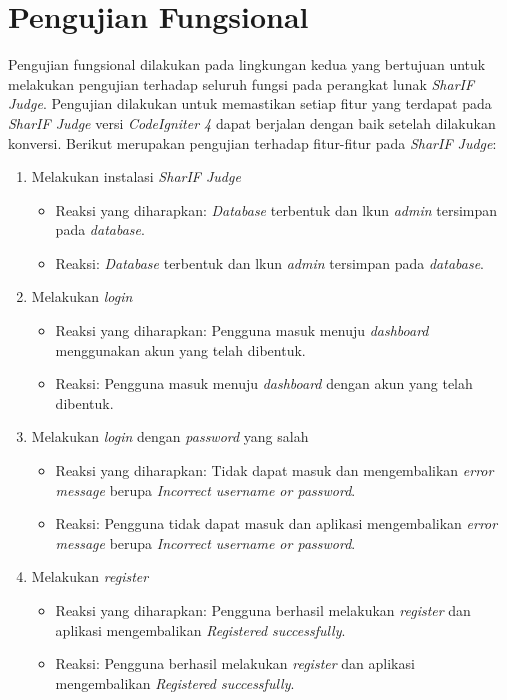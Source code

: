\section{Pengujian Fungsional}
Pengujian fungsional dilakukan pada lingkungan kedua yang bertujuan untuk melakukan pengujian terhadap seluruh fungsi pada perangkat lunak \textit{SharIF Judge}. Pengujian dilakukan untuk memastikan setiap fitur yang terdapat pada \textit{SharIF Judge} versi \textit{CodeIgniter 4} dapat berjalan dengan baik setelah dilakukan konversi. Berikut merupakan pengujian terhadap fitur-fitur pada \textit{SharIF Judge}:
\begin{enumerate}
	\item Melakukan instalasi \textit{SharIF Judge}
		\begin{itemize}
			\item Reaksi yang diharapkan: \textit{Database} terbentuk dan lkun \textit{admin} tersimpan pada \textit{database}.
			\item Reaksi: \textit{Database} terbentuk dan lkun \textit{admin} tersimpan pada \textit{database}.
		\end{itemize}
	\item Melakukan \textit{login}
		\begin{itemize}
			\item Reaksi yang diharapkan: Pengguna masuk menuju \textit{dashboard} menggunakan akun yang telah dibentuk.
			\item Reaksi: Pengguna masuk menuju \textit{dashboard} dengan akun yang telah dibentuk.
		\end{itemize}
	\item Melakukan \textit{login} dengan \textit{password} yang salah
		\begin{itemize}
			\item Reaksi yang diharapkan: Tidak dapat masuk dan mengembalikan \textit{error message} berupa \textit{Incorrect username or password}.
			\item Reaksi: Pengguna tidak dapat masuk dan aplikasi mengembalikan \textit{error message} berupa \textit{Incorrect username or password}.
		\end{itemize}
	\item Melakukan \textit{register}
	 	\begin{itemize}
	 		\item Reaksi yang diharapkan: Pengguna berhasil melakukan \textit{register} dan aplikasi mengembalikan \textit{Registered successfully}.
	 		\item Reaksi: Pengguna berhasil melakukan \textit{register} dan aplikasi mengembalikan \textit{Registered successfully}.

\end{itemize}
\end{enumerate}
